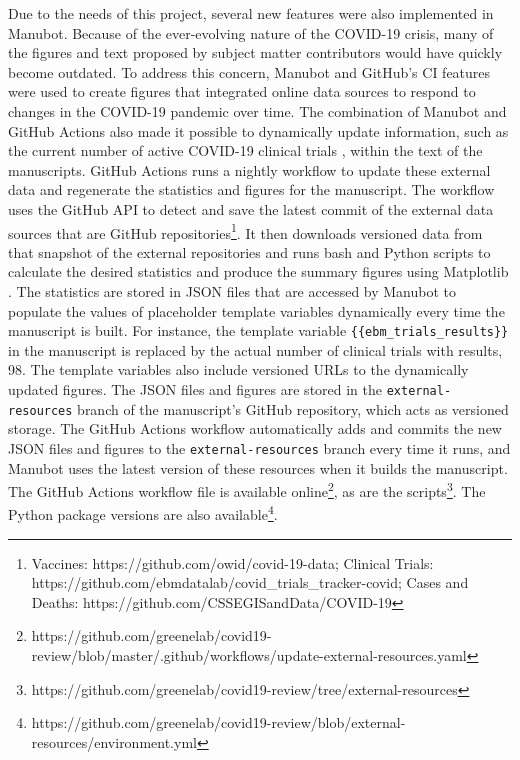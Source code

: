 \documentclass[twocolumn]{ceurart}
\begin{document}
Due to the needs of this project, several new features were also implemented in Manubot.
Because of the ever-evolving nature of the COVID-19 crisis, many of the figures and text proposed by subject matter contributors would have quickly become outdated.
To address this concern, Manubot and GitHub's CI features were used to create figures that integrated online data sources to respond to changes in the COVID-19 pandemic over time.
The combination of Manubot and GitHub Actions also made it possible to dynamically update information, such as the current number of active COVID-19 clinical trials \citep{cifK9B8t}, within the text of the manuscripts.
GitHub Actions runs a nightly workflow to update these external data and regenerate the statistics and figures for the manuscript.
The workflow uses the GitHub API to detect and save the latest commit of the external data sources that are GitHub repositories\footnote{Vaccines: https://github.com/owid/covid-19-data; Clinical Trials: https://github.com/ebmdatalab/covid\_trials\_tracker-covid; Cases and Deaths: https://github.com/CSSEGISandData/COVID-19}.
It then downloads versioned data from that snapshot of the external repositories and runs bash and Python scripts to calculate the desired statistics and produce the summary figures using Matplotlib \citep{1026Gxdsi}.
The statistics are stored in JSON files that are accessed by Manubot to populate the values of placeholder template variables dynamically every time the manuscript is built.
For instance, the template variable \texttt{\{\{ebm\_trials\_results\}\}} in the manuscript is replaced by the actual number of clinical trials with results, 98.
The template variables also include versioned URLs to the dynamically updated figures.
The JSON files and figures are stored in the \texttt{external-resources} branch of the manuscript's GitHub repository, which acts as versioned storage.
The GitHub Actions workflow automatically adds and commits the new JSON files and figures to the \texttt{external-resources} branch every time it runs, and Manubot uses the latest version of these resources when it builds the manuscript.
The GitHub Actions workflow file is available online\footnote{https://github.com/greenelab/covid19-review/blob/master/.github/workflows/update-external-resources.yaml}, as are the scripts\footnote{https://github.com/greenelab/covid19-review/tree/external-resources}.
The Python package versions are also available\footnote{https://github.com/greenelab/covid19-review/blob/external-resources/environment.yml}.
\end{document}
